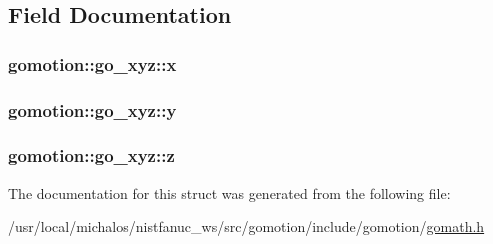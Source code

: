 \subsection{Field Documentation}
\hypertarget{structgomotion_1_1go__xyz_a469ce91ff180b9f80119faaa2e8c4e08}{
\subsubsection[{x}]{ gomotion\-::go\-\_\-xyz\-::x}}\label{structgomotion_1_1go__xyz_a469ce91ff180b9f80119faaa2e8c4e08}
\hypertarget{structgomotion_1_1go__xyz_a452aa1954ffdfb5400356e60394190bd}{
\subsubsection[{y}]{ gomotion\-::go\-\_\-xyz\-::y}}\label{structgomotion_1_1go__xyz_a452aa1954ffdfb5400356e60394190bd}
\hypertarget{structgomotion_1_1go__xyz_a08df5cfb57694ab8caaec6f989b3f739}{
\subsubsection[{z}]{ gomotion\-::go\-\_\-xyz\-::z}}\label{structgomotion_1_1go__xyz_a08df5cfb57694ab8caaec6f989b3f739}


The documentation for this struct was generated from the following file\-:\begin{DoxyCompactItemize}
\item 
/usr/local/michalos/nistfanuc\-\_\-ws/src/gomotion/include/gomotion/\hyperlink{gomath_8h}{gomath.\-h}\end{DoxyCompactItemize}
